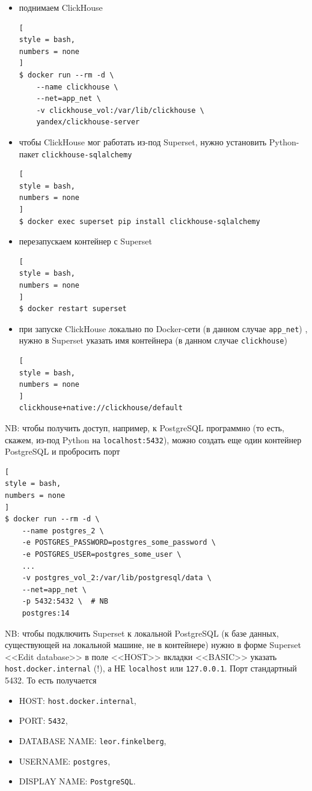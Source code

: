 \documentclass[%
	11pt,
	a4paper,
	utf8,
		]{article}
\begin{document}
\begin{itemize}
\begin{lstlisting}[
style = bash,
numbers = none
]
$ docker exec -it superset superset init
\end{lstlisting}
    \item поднимаем ClickHouse
\begin{lstlisting}[
style = bash,
numbers = none
]
$ docker run --rm -d \
    --name clickhouse \
    --net=app_net \
    -v clickhouse_vol:/var/lib/clickhouse \
    yandex/clickhouse-server
\end{lstlisting}
    \item чтобы ClickHouse мог работать из-под Superset, нужно установить Python-пакет \verb*|clickhouse-sqlalchemy|
\begin{lstlisting}[
style = bash,
numbers = none
]
$ docker exec superset pip install clickhouse-sqlalchemy
\end{lstlisting}
    \item перезапускаем контейнер с Superset
\begin{lstlisting}[
style = bash,
numbers = none
]
$ docker restart superset
\end{lstlisting}
    \item при запуске ClickHouse локально по Docker-сети (в данном случае \verb*|app_net|) , нужно в Superset указать имя контейнера (в данном случае \verb*|clickhouse|)
\begin{lstlisting}[
style = bash,
numbers = none
]
clickhouse+native://clickhouse/default
\end{lstlisting}
\end{itemize}

NB: чтобы получить доступ, например, к PostgreSQL программно (то есть, скажем, из-под Python на \verb*|localhost:5432|), можно создать еще один контейнер PostgreSQL и пробросить порт
\begin{lstlisting}[
style = bash,
numbers = none
]
$ docker run --rm -d \
    --name postgres_2 \
    -e POSTGRES_PASSWORD=postgres_some_password \
    -e POSTGRES_USER=postgres_some_user \
    ...
    -v postgres_vol_2:/var/lib/postgresql/data \
    --net=app_net \
    -p 5432:5432 \  # NB
    postgres:14
\end{lstlisting}

NB: чтобы подключить Superset к локальной PostgreSQL (к базе данных, существующей на локальной машине, не в контейнере) нужно в форме Superset <<Edit database>> в поле <<HOST>> вкладки <<BASIC>> указать {\color{blue}\verb*|host.docker.internal|} (!), а НЕ \verb*|localhost| или \verb*|127.0.0.1|. Порт стандартный 5432. То есть получается
\begin{itemize}
	\item HOST: \verb*|host.docker.internal|,
	
	\item PORT: \verb*|5432|,
	
	\item DATABASE NAME: \verb*|leor.finkelberg|,
	
	\item USERNAME: \verb*|postgres|,
	
	\item DISPLAY NAME: \verb*|PostgreSQL|.
\end{itemize}
\end{document}
